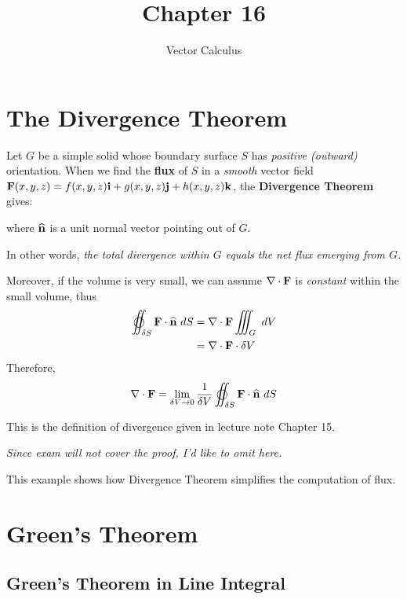 \documentclass[11pt, a4paper]{MATH2023}
\title{Chapter 16}
\subtitle{Vector Calculus}
\newcommand{\ii}{{\bf i}}
\newcommand{\jj}{{\bf j}}
\newcommand{\kk}{{\bf k}}
\newcommand{\FF}{{\bf F}}
\newcommand{\nm}{\widehat{\bf n}}
\begin{document}
\begin{spacing}{1.3}

    \section{The Divergence Theorem}

    Let $G$ be a simple solid whose boundary surface $S$ has {\it positive (outward)} orientation.
    When we find the {\bf flux} of $S$ in a {\it smooth} vector field
    $\FF(x,y,z)=f(x,y,z)\ii + g(x,y,z)\jj +h(x,y,z)\kk$, 
    the {\bf Divergence Theorem} gives:
    \begin{center}
        \boxed{$$\disp \varoiint_S  \FF\cdot \nm\ dS=\iiint_G \nabla\cdot \FF\ dV$$}
    \end{center}
    where $\nm$ is a unit normal vector pointing out of $G$.

    In other words, {\it the total divergence within $G$ equals the net flux emerging from $G$.}

    \vspace{0.5in}
    Moreover, if the volume is very small, we can assume $\nabla\cdot \FF$ is {\it constant} within 
    the small volume, thus 
    \begin{align*}
        \varoiint_{\delta S}\FF\cdot \nm \ dS &= \nabla \cdot \FF \iiint_{G}\ dV \\
        &= \nabla\cdot \FF \cdot \delta V
    \end{align*}
    Therefore, $$\nabla\cdot \FF =\lim_{\delta V\rightarrow 0} \frac{1}{\delta V}
    \varoiint_{\delta S} \FF\cdot \nm \ dS$$

    This is the definition of divergence given in lecture note Chapter 15.

    \vspace{0.7in}
    {\it Since exam will not cover the proof, I'd like to omit here.}


    \newpage
    {\blue This example shows how Divergence Theorem simplifies the computation of flux.}



    \newpage
    \section{Green's Theorem}
    \subsection{Green's Theorem in Line Integral}


\end{spacing}
\end{document}
